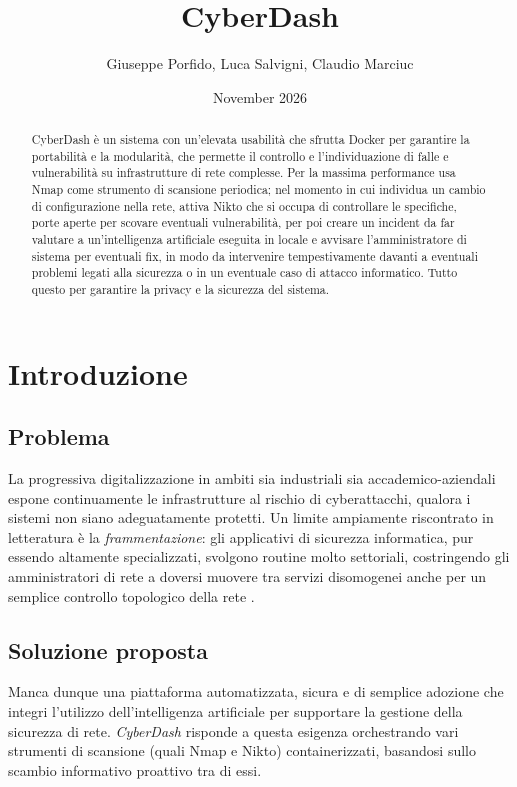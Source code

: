 \documentclass{article}
\title{CyberDash}
\author{Giuseppe Porfido, Luca Salvigni, Claudio Marciuc}
\date{November 2026}
\begin{document}
 
\maketitle

\begin{abstract}
CyberDash è un sistema con un'elevata usabilità che sfrutta Docker per garantire la portabilità e la modularità, che permette il controllo e l'individuazione di falle e vulnerabilità su infrastrutture di rete complesse. Per la massima performance usa Nmap come strumento di scansione periodica; nel momento in cui individua un cambio di configurazione nella rete, attiva Nikto che si occupa di controllare le specifiche, porte aperte per scovare eventuali vulnerabilità, per poi creare un incident da far valutare a un'intelligenza artificiale eseguita in locale e avvisare l'amministratore di sistema per eventuali fix, in modo da intervenire tempestivamente davanti a eventuali problemi legati alla sicurezza o in un eventuale caso di attacco informatico. Tutto questo per garantire la privacy e la sicurezza del sistema.
\end{abstract}


\tableofcontents

\newpage

\section{Introduzione}
\label{sec:intro}
\subsection{Problema}
La progressiva digitalizzazione in ambiti sia industriali sia accademico-aziendali espone continuamente le infrastrutture al rischio di cyberattacchi, qualora i sistemi non siano adeguatamente protetti.
Un limite ampiamente riscontrato in letteratura è la \textit{frammentazione}: gli applicativi di sicurezza informatica, pur essendo altamente specializzati, svolgono routine molto settoriali, costringendo gli amministratori di rete a doversi muovere tra servizi disomogenei anche per un semplice controllo topologico della rete \cite{alkhunaizi_toward_2025, kumar_aipentool_2025}.

\subsection{Soluzione proposta}
Manca dunque una piattaforma automatizzata, sicura e di semplice adozione che integri l'utilizzo dell'intelligenza artificiale per supportare la gestione della sicurezza di rete. \textit{CyberDash} risponde a questa esigenza orchestrando vari strumenti di scansione (quali Nmap e Nikto) containerizzati, basandosi sullo scambio informativo proattivo tra di essi.
\end{document}
